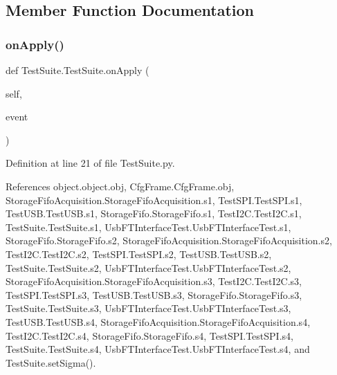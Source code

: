 \subsection{Member Function Documentation}
\mbox{\label{classTestSuite_1_1TestSuite_a40cdae2e901d21c94a0153699f518846}} 
\subsubsection{\texorpdfstring{on\+Apply()}{onApply()}}
{\footnotesize\ttfamily def Test\+Suite.\+Test\+Suite.\+on\+Apply (\begin{DoxyParamCaption}\item[{}]{self,  }\item[{}]{event }\end{DoxyParamCaption})}



Definition at line 21 of file Test\+Suite.\+py.



References object.\+object.\+obj, Cfg\+Frame.\+Cfg\+Frame.\+obj, Storage\+Fifo\+Acquisition.\+Storage\+Fifo\+Acquisition.\+s1, Test\+S\+P\+I.\+Test\+S\+P\+I.\+s1, Test\+U\+S\+B.\+Test\+U\+S\+B.\+s1, Storage\+Fifo.\+Storage\+Fifo.\+s1, Test\+I2\+C.\+Test\+I2\+C.\+s1, Test\+Suite.\+Test\+Suite.\+s1, Usb\+F\+T\+Interface\+Test.\+Usb\+F\+T\+Interface\+Test.\+s1, Storage\+Fifo.\+Storage\+Fifo.\+s2, Storage\+Fifo\+Acquisition.\+Storage\+Fifo\+Acquisition.\+s2, Test\+I2\+C.\+Test\+I2\+C.\+s2, Test\+S\+P\+I.\+Test\+S\+P\+I.\+s2, Test\+U\+S\+B.\+Test\+U\+S\+B.\+s2, Test\+Suite.\+Test\+Suite.\+s2, Usb\+F\+T\+Interface\+Test.\+Usb\+F\+T\+Interface\+Test.\+s2, Storage\+Fifo\+Acquisition.\+Storage\+Fifo\+Acquisition.\+s3, Test\+I2\+C.\+Test\+I2\+C.\+s3, Test\+S\+P\+I.\+Test\+S\+P\+I.\+s3, Test\+U\+S\+B.\+Test\+U\+S\+B.\+s3, Storage\+Fifo.\+Storage\+Fifo.\+s3, Test\+Suite.\+Test\+Suite.\+s3, Usb\+F\+T\+Interface\+Test.\+Usb\+F\+T\+Interface\+Test.\+s3, Test\+U\+S\+B.\+Test\+U\+S\+B.\+s4, Storage\+Fifo\+Acquisition.\+Storage\+Fifo\+Acquisition.\+s4, Test\+I2\+C.\+Test\+I2\+C.\+s4, Storage\+Fifo.\+Storage\+Fifo.\+s4, Test\+S\+P\+I.\+Test\+S\+P\+I.\+s4, Test\+Suite.\+Test\+Suite.\+s4, Usb\+F\+T\+Interface\+Test.\+Usb\+F\+T\+Interface\+Test.\+s4, and Test\+Suite.\+set\+Sigma().



